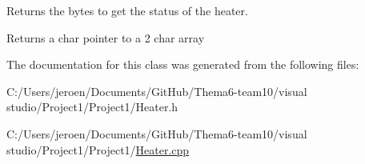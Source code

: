 Returns the bytes to get the status of the heater. 

\begin{DoxyReturn}{Returns}
a char pointer to a 2 char array 
\end{DoxyReturn}


The documentation for this class was generated from the following files\+:\begin{DoxyCompactItemize}
\item 
C\+:/\+Users/jeroen/\+Documents/\+Git\+Hub/\+Thema6-\/team10/visual studio/\+Project1/\+Project1/Heater.\+h\item 
C\+:/\+Users/jeroen/\+Documents/\+Git\+Hub/\+Thema6-\/team10/visual studio/\+Project1/\+Project1/\hyperlink{_heater_8cpp}{Heater.\+cpp}\end{DoxyCompactItemize}
